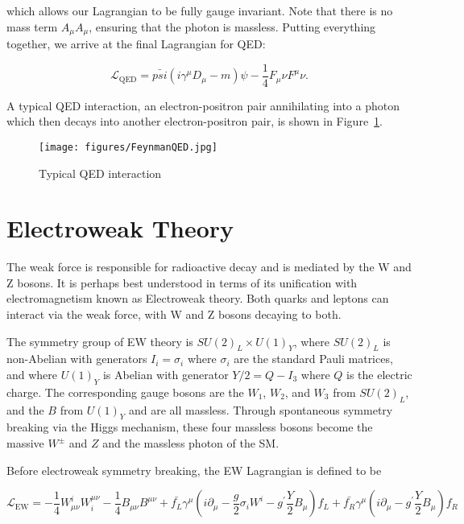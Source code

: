 which allows our Lagrangian to be fully gauge invariant. Note that there is no mass term $A_{\mu}A_{\mu}$, ensuring that the photon is massless. Putting everything together, we arrive at the final Lagrangian for QED:

\begin{equation}
\mathcal{L}_{\text{QED}} = \bar{psi}\left(i\gamma^{\mu}D_{\mu} - m\right)\psi - \frac{1}{4}F_{\mu}{\nu}F^{\mu}{\nu}.
\end{equation} 

A typical QED interaction, an electron-positron pair annihilating into a photon which then decays into another electron-positron pair, is shown in Figure~\ref{fig:FeynmanQED}.

\begin{figure}
\centering
  \texttt{[image: figures/FeynmanQED.jpg]}
  \caption{\label{fig:FeynmanQED} Typical QED interaction}
\end{figure}


\section{Electroweak Theory}

The weak force is responsible for radioactive decay and is mediated by the W and Z bosons. It is perhaps best understood in terms of its unification with electromagnetism known as Electroweak theory. Both quarks and leptons can interact via the weak force, with W and Z bosons decaying to both. 

The symmetry group of EW theory is $SU(2)_{L} \times U(1)_{Y}$, where $SU(2)_{L}$ is non-Abelian with generators $I_{i} = \sigma_{i}$ where $\sigma_{i}$ are the standard Pauli matrices, and where $U(1)_{Y}$ is Abelian with generator $Y/2 = Q - I_{3}$ where $Q$ is the electric charge. The corresponding gauge bosons are the $W_{1}$, $W_{2}$, and $W_{3}$ from $SU(2)_{L}$, and the $B$ from $U(1)_{Y}$ and are all massless. Through spontaneous symmetry breaking via the Higgs mechanism, these four massless bosons become the massive $W^{\pm}$ and $Z$ and the massless photon of the SM.

Before electroweak symmetry breaking, the EW Lagrangian is defined to be

\begin{equation}
\mathcal{L}_{\text{EW}} = -\frac{1}{4}W^{i}_{\mu\nu}W^{\mu\nu}_{i} - \frac{1}{4}B_{\mu\nu}B^{\mu\nu} + \bar{f_{L}}\gamma^{\mu}\left(i\partial_{\mu} - \frac{g}{2}\sigma_{i}W^{i} - g^{\prime}\frac{Y}{2}B_{\mu}\right)f_{L} + 
\bar{f_{R}}\gamma^{\mu}\left(i\partial_{\mu} - g^{\prime}\frac{Y}{2}B_{\mu}\right)f_{R}
\end{equation}


